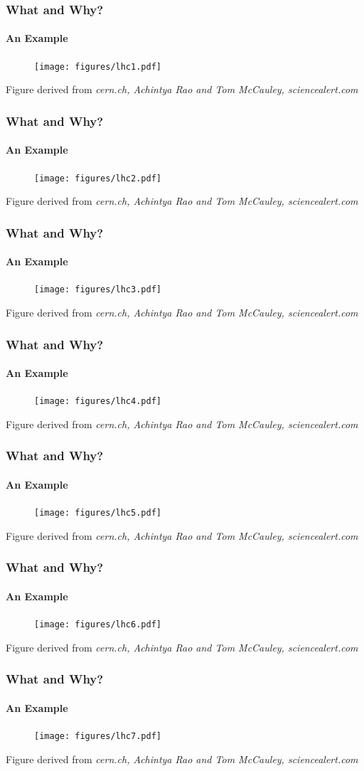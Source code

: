 \documentclass[9pt, aspectratio=169]{beamer}
\begin{document}
\begin{frame}
\frametitle{What and Why?}
\framesubtitle{An Example}
	\begin{figure}
	\texttt{[image: figures/lhc1.pdf]}
\end{figure}
\tiny Figure derived from \textit{cern.ch, Achintya Rao and Tom McCauley, sciencealert.com}
\end{frame}
\begin{frame}
\frametitle{What and Why?}
\framesubtitle{An Example}
\begin{figure}
	\texttt{[image: figures/lhc2.pdf]}
\end{figure}
\tiny Figure derived from \textit{cern.ch, Achintya Rao and Tom McCauley, sciencealert.com}
\end{frame}
\begin{frame}
\frametitle{What and Why?}
\framesubtitle{An Example}
\begin{figure}
\texttt{[image: figures/lhc3.pdf]}
\end{figure}
\tiny Figure derived from \textit{cern.ch, Achintya Rao and Tom McCauley, sciencealert.com}
\end{frame} \begin{frame}
\frametitle{What and Why?}
\framesubtitle{An Example}
\begin{figure}
\texttt{[image: figures/lhc4.pdf]}
\end{figure}
\tiny Figure derived from \textit{cern.ch, Achintya Rao and Tom McCauley, sciencealert.com}
\end{frame} \begin{frame}
\frametitle{What and Why?}
\framesubtitle{An Example}
\begin{figure}
\texttt{[image: figures/lhc5.pdf]}
\end{figure}
\tiny Figure derived from \textit{cern.ch, Achintya Rao and Tom McCauley, sciencealert.com}
\end{frame} \begin{frame}
\frametitle{What and Why?}
\framesubtitle{An Example}
\begin{figure}
\texttt{[image: figures/lhc6.pdf]}
\end{figure}
\tiny Figure derived from \textit{cern.ch, Achintya Rao and Tom McCauley, sciencealert.com}
\end{frame} \begin{frame}
\frametitle{What and Why?}
\framesubtitle{An Example}
\begin{figure}
\texttt{[image: figures/lhc7.pdf]}
\end{figure}
\tiny Figure derived from \textit{cern.ch, Achintya Rao and Tom McCauley, sciencealert.com}
\end{frame} 
\end{document}
